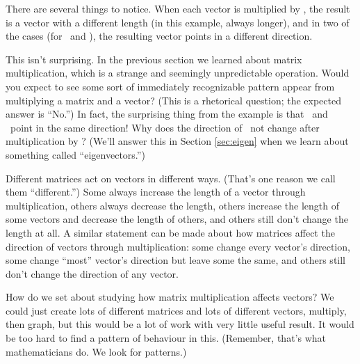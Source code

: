\medskip

There are several things to notice. When each vector is multiplied by \tta, the result is a vector with a different length (in this example, always longer), and in two of the cases (for \vy\ and \vz), the resulting vector points in a different direction. 

This isn't surprising. In the previous section we learned about matrix multiplication, which is a strange and seemingly unpredictable operation. Would you expect to see some sort of immediately recognizable pattern appear from multiplying a matrix and a vector? (This is a rhetorical question; the expected answer is ``No.'') In fact, the surprising thing from the example is that \vx\ and \tta\vx\ point in the same direction! Why does the direction of \vx\ not change after multiplication by \tta? (We'll answer this in Section \ref{sec:eigen} when we learn about something called ``eigenvectors.'')


Different matrices act on vectors in different ways. (That's one reason we call them ``different.'') Some always increase the length of a vector through  multiplication, others always decrease the length, others increase the length of some vectors and decrease the length of others, and others still don't change the length at all. A similar statement can be made about how matrices affect the direction of vectors through multiplication: some change every vector's direction, some change ``most'' vector's direction but leave some the same, and others still don't change the direction of any vector.

How do we set about studying how matrix multiplication affects vectors? We could just create lots of different matrices and lots of different vectors, multiply, then graph, but this would be a lot of work with very little useful result. It would be too hard to find a pattern of behaviour in this. (Remember, that's what mathematicians do. We look for patterns.)

